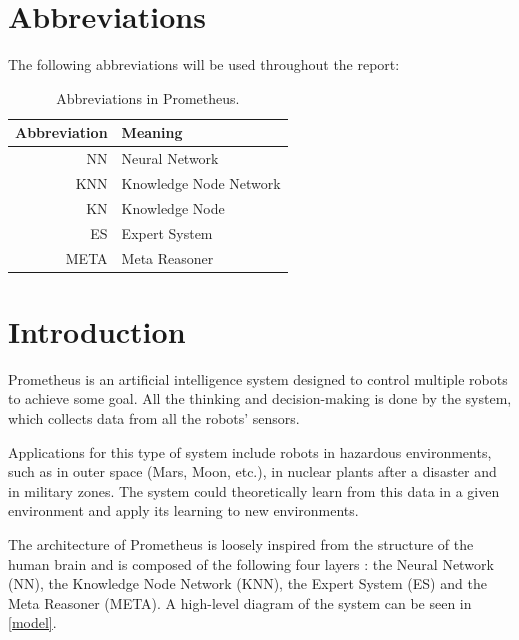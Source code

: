 \documentclass[titlepage,11pt]{article}
\begin{document}
\clearpage
\tableofcontents

\listoffigures
\listoftables
\clearpage

\twocolumn

\section*{Abbreviations}

The following abbreviations will be used throughout the report:

\begin{table}[!htb]
	\centering
	\caption{Abbreviations in Prometheus.}
	\begin{tabular}{r | l}
		\textbf{Abbreviation} & \textbf{Meaning} \\ \hline
		NN & Neural Network \\
		KNN & Knowledge Node Network \\
		KN & Knowledge Node \\
		ES & Expert System \\
		META & Meta Reasoner
	\end{tabular}
	\label{table:abbrevations}
\end{table}

\section{Introduction} \label{sec:intro}

Prometheus is an artificial intelligence system designed to control multiple robots to achieve some goal. All the thinking and decision-making is done by the system, which collects data from all the robots' sensors.

Applications for this type of system include robots in hazardous environments, such as in outer space (Mars, Moon, etc.), in nuclear plants after a disaster and in military zones.  The system could theoretically learn from this data in a given environment and apply its learning to new environments.

The architecture of Prometheus is loosely inspired from the structure of the human brain and is composed of the following four layers \cite{vybihal-model}: the Neural Network (NN), the Knowledge Node Network (KNN), the Expert System (ES) and the Meta Reasoner (META). A high-level diagram of the system can be seen in \autoref{model}.
\end{document}

